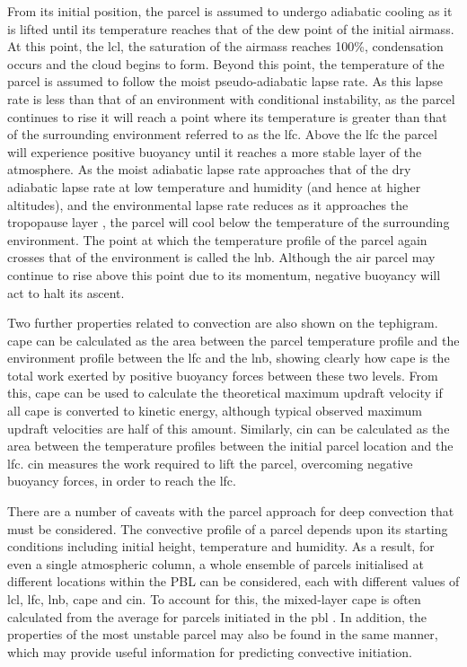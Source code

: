 From its initial position, the parcel is assumed to undergo adiabatic cooling as it is lifted until its temperature reaches that of the dew point of the initial airmass. 
At this point, the \acrshort{lcl}, the saturation of the airmass reaches 100\%, condensation occurs and the cloud begins to form. 
Beyond this point, the temperature of the parcel is assumed to follow the moist pseudo-adiabatic lapse rate. 
As this lapse rate is less than that of an environment with conditional instability, as the parcel continues to rise it will reach a point where its temperature is greater than that of the surrounding environment referred to as the \acrshort{lfc}. 
Above the \acrshort{lfc} the parcel will experience positive buoyancy until it reaches a more stable layer of the atmosphere. 
As the moist adiabatic lapse rate approaches that of the dry adiabatic lapse rate at low temperature and humidity (and hence at higher altitudes), and the environmental lapse rate reduces as it approaches the tropopause layer \citep{fueglistaler_tropical_2009}, the parcel will cool below the temperature of the surrounding environment. 
The point at which the temperature profile of the parcel again crosses that of the environment is called the \acrfull{lnb}. 
Although the air parcel may continue to rise above this point due to its momentum, negative buoyancy will act to halt its ascent.

Two further properties related to convection are also shown on the tephigram. 
\acrshort{cape} can be calculated as the area between the parcel temperature profile and the environment profile between the \acrshort{lfc} and the \acrshort{lnb}, showing clearly how \acrshort{cape} is the total work exerted by positive buoyancy forces between these two levels. 
From this, \acrshort{cape} can be used to calculate the theoretical maximum updraft velocity if all \acrshort{cape} is converted to kinetic energy, although typical observed maximum updraft velocities are half of this amount. 
Similarly, \acrfull{cin} can be calculated as the area between the temperature profiles between the initial parcel location and the \acrshort{lfc}. 
\acrshort{cin} measures the work required to lift the parcel, overcoming negative buoyancy forces, in order to reach the \acrshort{lfc}.

There are a number of caveats with the parcel approach for deep convection that must be considered. 
The convective profile of a parcel depends upon its starting conditions including initial height, temperature and humidity. 
As a result, for even a single atmospheric column, a whole ensemble of parcels initialised at different locations within the PBL can be considered, each with different values of \acrshort{lcl}, \acrshort{lfc}, \acrshort{lnb}, \acrshort{cape} and \acrshort{cin}. 
To account for this, the mixed-layer \acrshort{cape} is often calculated from the average for parcels initiated in the \acrshort{pbl} \citep{stull_practical_2016}. 
In addition, the properties of the most unstable parcel may also be found in the same manner, which may provide useful information for predicting convective initiation.

